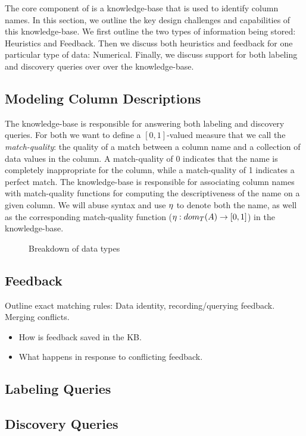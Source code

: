 
The core component of \systemname is a knowledge-base that is used to identify column names.
In this section, we outline the key design challenges and capabilities of this knowledge-base.  
We first outline the two types of information being stored: Heuristics and Feedback.
Then we discuss both heuristics and feedback for one particular type of data: Numerical.  
Finally, we discuss support for both labeling and discovery queries over over the knowledge-base.

\subsection{Modeling Column Descriptions}

The \systemname knowledge-base is responsible for answering both labeling and discovery queries.
For both we want to define a $[0,1]$-valued measure that we call the \emph{match-quality}: the quality of a match between a column name and a collection of data values in the column.
A match-quality of 0 indicates that the name is completely inappropriate for the column, while a match-quality of 1 indicates a perfect match.  
The \systemname knowledge-base is responsible for associating column names with match-quality functions for computing the descriptiveness of the name on a given column.
We will abuse syntax and use $\eta$ to denote both the name, as well as the corresponding match-quality function ($\eta : dom_T(A) \rightarrow [0,1]$) in the knowledge-base.

\begin{figure}
\caption{Breakdown of data types}
\label{fig:type-breakdown}
\end{figure}


\subsection{Feedback}

Outline exact matching rules: Data identity, recording/querying feedback.  Merging conflicts.

\begin{itemize}
  \item How is feedback saved in the KB.
  \item What happens in response to conflicting feedback.  
\end{itemize}



\subsection{Labeling Queries}

\subsection{Discovery Queries}
